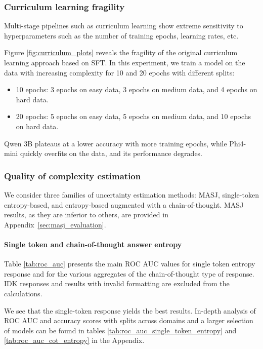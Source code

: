 \subsubsection{Curriculum learning fragility}

Multi-stage pipelines such as curriculum learning show extreme sensitivity to hyperparameters such as the number of training epochs, learning rates, etc.

Figure \ref{fig:curriculum_plots} reveals the fragility of the original curriculum learning approach based on SFT. In this experiment, we train a model on the data with increasing complexity for 10 and 20 epochs with different splits: 
\begin{itemize}
    \item 10 epochs: 3 epochs on easy data, 3 epochs on medium data, and 4 epochs on hard data.
    \item 20 epochs: 5 epochs on easy data, 5 epochs on medium data, and 10 epochs on hard data. 
\end{itemize}
Qwen 3B plateaus at a lower accuracy with more training epochs, while Phi4-mini quickly overfits on the data, and its performance degrades.



\subsubsection{Quality of complexity estimation}

We consider three families of uncertainty estimation methods: MASJ, single-token entropy-based, and entropy-based augmented with a chain-of-thought.
MASJ results, as they are inferior to others, are provided in Appendix~\ref{sec:masj_evaluation}.

\paragraph{Single token and chain-of-thought answer entropy}

Table \ref{tab:roc_auc} presents the main ROC AUC values for single token entropy response and for the various aggregates of the chain-of-thought type of response. IDK responses and results with invalid formatting are excluded from the calculations. 

We see that the single-token response yields the best results. In-depth analysis of ROC AUC and accuracy scores with splits across domains and a larger selection of models can be found in tables \ref{tab:roc_auc_single_token_entropy} and \ref{tab:roc_auc_cot_entropy} in the Appendix.

